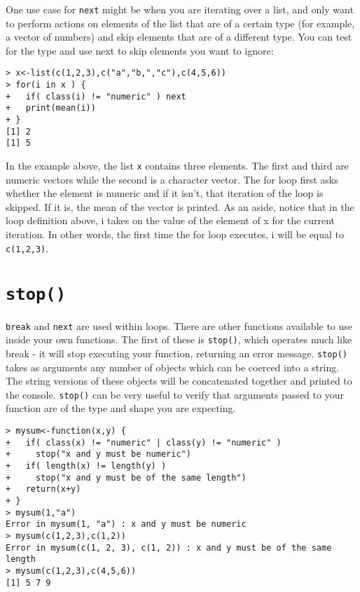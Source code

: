 \documentclass[12pt, oneside]{amsart}   	%
\begin{document}
One use case for \texttt{next} might be when you are iterating over a list, and only want to perform actions on elements of the list that are of a certain type (for example, a vector of numbers) and skip elements that are of a different type. You can test for the type and use next to skip elements you want to ignore:

\begin{verbatim}
> x<-list(c(1,2,3),c("a","b,","c"),c(4,5,6))
> for(i in x ) {
+   if( class(i) != "numeric" ) next
+   print(mean(i))
+ }
[1] 2
[1] 5
\end{verbatim}

In the example above, the list \texttt{x} contains three elements. The first and third are numeric vectors while the second is a character vector. The for loop first asks whether the element is numeric and if it isn't, that iteration of the loop is skipped. If it is, the mean of the vector is printed. As an aside, notice that in the loop definition above, i takes on the value of the element of x for the current iteration. In other words, the first time the for loop executes, i will be equal to \texttt{c(1,2,3)}. 

\section{\texttt{stop()}}

\texttt{break} and \texttt{next} are used within loops. There are other functions available to use inside your own functions. The first of these is \texttt{stop()}, which operates much like break - it will stop executing your function, returning an error message. \texttt{stop()} takes as arguments any number of objects which can be coerced into a string. The string versions of these objects will be concatenated together and printed to the console. \texttt{stop()} can be very useful to verify that arguments passed to your function are of the type and shape you are expecting. 

\begin{verbatim}
> mysum<-function(x,y) {
+   if( class(x) != "numeric" | class(y) != "numeric" ) 
+     stop("x and y must be numeric")
+   if( length(x) != length(y) ) 
+     stop("x and y must be of the same length")
+   return(x+y)
+ }
> mysum(1,"a")
Error in mysum(1, "a") : x and y must be numeric
> mysum(c(1,2,3),c(1,2))
Error in mysum(c(1, 2, 3), c(1, 2)) : x and y must be of the same length
> mysum(c(1,2,3),c(4,5,6))
[1] 5 7 9
\end{verbatim}
\end{document}
